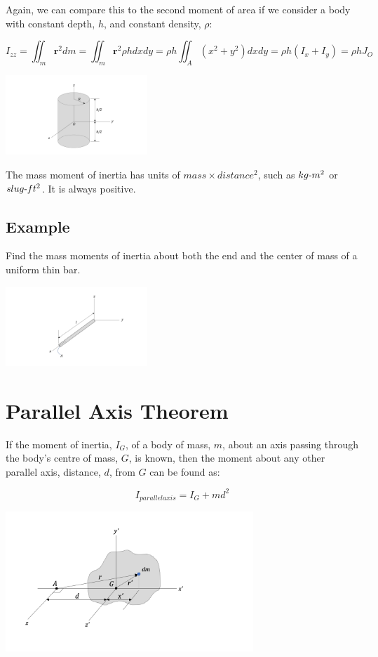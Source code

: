 \documentclass[12pt,letterpaper,twoside]{report}
\begin{document}
Again, we can compare this to the second moment of area if we consider a body with constant depth, $h$, and constant density, $\rho$:

\[
\displaystyle I_{zz} =  \iint_m \bm{r}^2 dm =  \iint_m \bm{r}^2 \rho h dx dy = \rho h  \iint_A (x^2 + y^2) dx dy = \rho h (I_x + I_y) = \rho h J_O
\]

\includegraphics[trim={8cm 1cm 5cm 1.5cm},clip,width=0.4\textwidth, left]{Slide45} 

The mass moment of inertia has units of $mass \times distance^2$,  such as $kg{\text -}m^2$ or $slug{\text -}ft^2$.  It is always positive. 


\subsection{Example}

Find the mass moments of inertia about both the end and the center of mass of a uniform thin bar.

\includegraphics[trim={8cm 1cm 5cm 1.5cm},clip,width=0.4\textwidth, left]{Slide46} 

\vspace*{10\baselineskip}

\newpage

\section{Parallel Axis Theorem}
If the moment of inertia, $I_G$, of a body of mass, $m$, about an axis passing through the body’s centre of mass, $G$, is known, then the moment about any other parallel axis, distance, $d$, from $G$ can be found as:

\[I_{parallel axis} = I_G + m d^2\]

\includegraphics[trim={1cm 2cm 7cm 1.5cm},clip,width=0.7\textwidth, left]{Slide47} 
\end{document}
